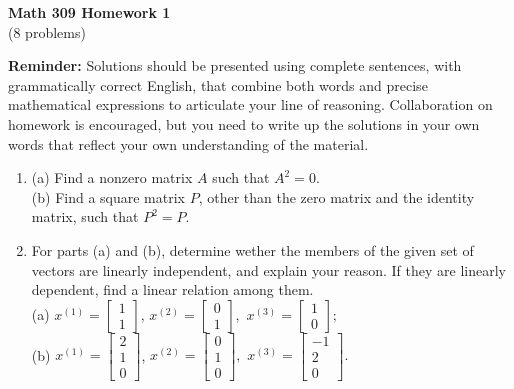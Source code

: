\documentclass[11pt]{article}
\theoremstyle{definition}
\begin{document}
\begin{center}
\textbf{Math 309 Homework 1}\\
(8 problems)
\end{center}
\vspace{0.2in}


\noindent \textbf{Reminder:}  Solutions should be presented using complete sentences, with grammatically correct English, that combine both words and precise mathematical expressions to articulate your line of reasoning.  Collaboration on homework is encouraged, but you need to write up the solutions in your own words that reflect your own understanding of the material. 



\begin{enumerate}[leftmargin=*]

\item (a) Find a nonzero matrix $A$ such that $A^2=0$.\\
(b) Find a square matrix $P$, other than the zero matrix and the identity matrix, such that $P^2=P$.

\item For parts (a) and (b), determine wether the members of the given set of vectors are linearly independent, and explain your reason.  If they are linearly dependent, find a linear relation among them.\\

(a) $x^{(1)} = \left[
\begin{array}{c}
1\\
1
\end{array}\right] 
$, $x^{(2)} = \left[
\begin{array}{c}
0\\
1
\end{array}\right],
$
$x^{(3)} = \left[
\begin{array}{c}
1\\
0
\end{array}\right];
$\\

(b) $x^{(1)} = \left[
\begin{array}{c}
2\\
1\\
0
\end{array}\right] 
$, $x^{(2)} = \left[
\begin{array}{c}
0\\
1\\
0
\end{array}\right],
$
$x^{(3)} = \left[
\begin{array}{c}
-1\\
2\\
0
\end{array}\right].
$\\


\end{enumerate}
\end{document}
